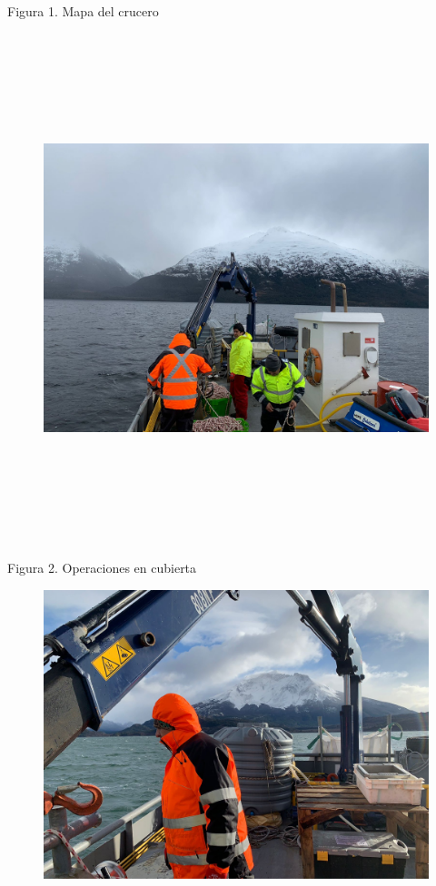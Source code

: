 \documentclass[
  letterpaper,
  DIV=11,
  numbers=noendperiod]{scrartcl}
\begin{document}
Figura 1. Mapa del crucero

\begin{figure}

{\centering \includegraphics[width=6.84375in,height=5.84375in]{WhatsApp Image 2023-09-06 at 13.03.25.jpeg}

}

\end{figure}

Figura 2. Operaciones en cubierta

\begin{figure}

{\centering \includegraphics[width=6.69792in,height=\textheight]{WhatsApp Image 2023-09-06 at 12.41.03 (2).jpeg}

}

\end{figure}
\end{document}
